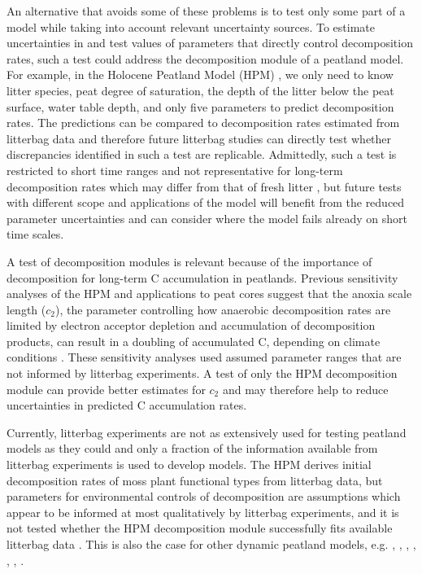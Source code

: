 \documentclass[esd, manuscript]{copernicus}
\begin{document}
An alternative that avoids some of these problems is to test only some part of a model while taking into account relevant uncertainty sources. To estimate uncertainties in and test values of parameters that directly control decomposition rates, such a test could address the decomposition module of a peatland model. For example, in the Holocene Peatland Model (HPM) \citep{Frolking.2010}, we only need to know litter species, peat degree of saturation, the depth of the litter below the peat surface, water table depth, and only five parameters to predict decomposition rates. The predictions can be compared to decomposition rates estimated from litterbag data and therefore future litterbag studies can directly test whether discrepancies identified in such a test are replicable. Admittedly, such a test is restricted to short time ranges and not representative for long-term decomposition rates which may differ from that of fresh litter \citep[e.g.,][]{Frolking.2001}, but future tests with different scope and applications of the model will benefit from the reduced parameter uncertainties and can consider where the model fails already on short time scales.

A test of decomposition modules is relevant because of the importance of decomposition for long-term C accumulation in peatlands. Previous sensitivity analyses of the HPM and applications to peat cores suggest that the anoxia scale length (\(c_2\)), the parameter controlling how anaerobic decomposition rates are limited by electron acceptor depletion and accumulation of decomposition products, can result in a doubling of accumulated C, depending on climate conditions \citep{Frolking.2010, Quillet.2013a, Kurnianto.2015}. These sensitivity analyses used assumed parameter ranges that are not informed by litterbag experiments. A test of only the HPM decomposition module can provide better estimates for \(c_2\) and may therefore help to reduce uncertainties in predicted C accumulation rates.

Currently, litterbag experiments are not as extensively used for testing peatland models as they could and only a fraction of the information available from litterbag experiments is used to develop models. The HPM derives initial decomposition rates of moss plant functional types from litterbag data, but parameters for environmental controls of decomposition are assumptions which appear to be informed at most qualitatively by litterbag experiments, and it is not tested whether the HPM decomposition module successfully fits available litterbag data \citep{Frolking.2010}. This is also the case for other dynamic peatland models, e.g. \citet{Frolking.2001}, \citet{Bauer.2004}, \citet{Heijmans.2008}, \citet{Heinemeyer.2010}, \citet{Morris.2012}, \citet{Chaudhary.2018}, \citet{Bona.2020}.
\end{document}
